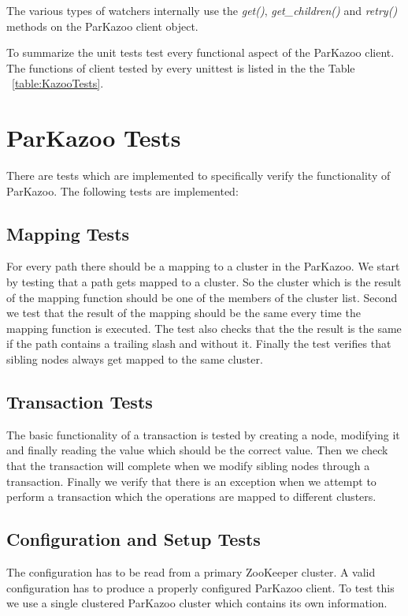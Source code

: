 	The various types of watchers internally use the \textit{get()}, \textit{get\_children()} and \textit{retry()} methods on the ParKazoo client object.

To summarize the unit tests test every functional aspect of the ParKazoo client. The functions of client tested by every unittest is listed in the the Table ~\ref{table:KazooTests}.



\section{ParKazoo Tests}
There are tests which are implemented to specifically verify the functionality of ParKazoo. The following tests
are implemented:

\subsection{Mapping Tests}
For every path there should be a mapping to a cluster in the ParKazoo. We start by testing that a path gets mapped to a cluster. So the cluster which is the result of the mapping function should be one of the members of the cluster list. Second we test that the result of the mapping should be the same every time the mapping function is executed. The test also checks that the the result is the same if the path contains a trailing slash and without it. Finally the test verifies that sibling nodes always get mapped to the same cluster.

\subsection{Transaction Tests}
The basic functionality of a transaction is tested by creating a node, modifying it and finally reading the value which should be the correct value. Then we check that the transaction will complete when we modify sibling nodes through a transaction. Finally we verify that there is an exception when we attempt to perform a transaction which the operations are mapped to different clusters.

\subsection{Configuration and Setup Tests}
The configuration has to be read from a primary ZooKeeper cluster. A valid configuration has to produce a properly configured ParKazoo client. To test this we use a single clustered ParKazoo cluster which contains its own information.

